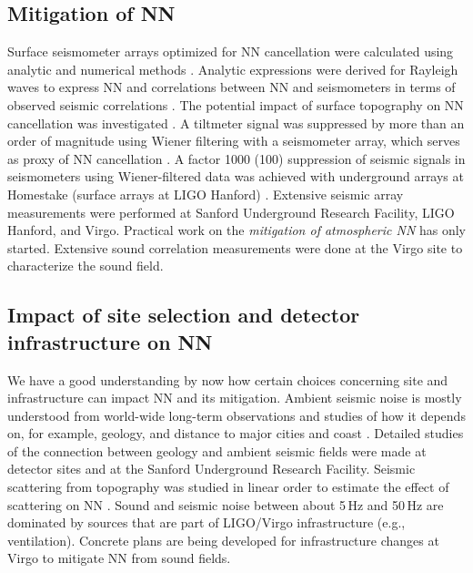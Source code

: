 \subsection{Mitigation of NN}
Surface seismometer arrays optimized for NN cancellation were calculated using analytic and numerical methods \cite{Har2015,CoEA2016a}. Analytic expressions were derived for Rayleigh waves to express NN and correlations between NN and seismometers in terms of observed seismic correlations \cite{Har2015,CoEA2016a}. The potential impact of surface topography on NN cancellation was investigated \cite{CoHa2012}. A tiltmeter signal was suppressed by more than an order of magnitude using Wiener filtering with a seismometer array, which serves as proxy of NN cancellation \cite{HaVe2016,CoEA2018}. A factor 1000 (100) suppression of seismic signals in seismometers using Wiener-filtered data was achieved with underground arrays at Homestake (surface arrays at LIGO Hanford) \cite{CoEA2014,CoEA2018}. Extensive seismic array measurements were performed at Sanford Underground Research Facility, LIGO Hanford, and Virgo. Practical work on the \emph{mitigation of atmospheric NN} has only started. Extensive sound correlation measurements were done at the Virgo site to characterize the sound field.

\subsection{Impact of site selection and detector infrastructure on NN}
We have a good understanding by now how certain choices concerning site and infrastructure can impact NN and its mitigation. Ambient seismic noise is mostly understood from world-wide long-term observations and studies of how it depends on, for example, geology, and distance to major cities and coast \cite{CoHa2012b}. Detailed studies of the connection between geology and ambient seismic fields were made at detector sites \cite{HaOR2011} and at the Sanford Underground Research Facility. Seismic scattering from topography was studied in linear order to estimate the effect of scattering on NN  \cite{CoHa2012}. Sound and seismic noise between about 5\,Hz and 50\,Hz are dominated by sources that are part of LIGO/Virgo infrastructure (e.g., ventilation). Concrete plans are being developed for infrastructure changes at Virgo to mitigate NN from sound fields.


